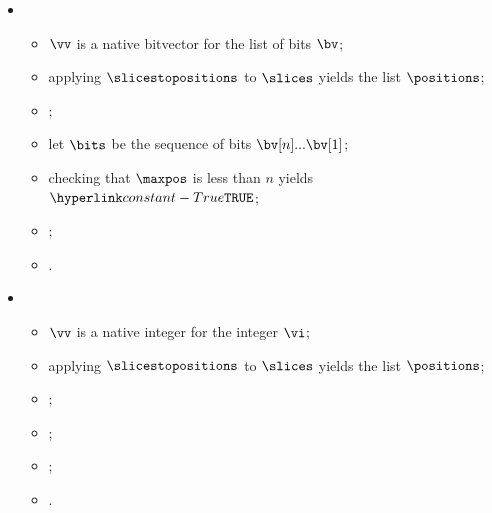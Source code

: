 \ProseParagraph
\OneApplies
\begin{itemize}
  \item {}
  \begin{itemize}
    \item $\vv$ is a native bitvector for the list of bits $\bv$;
    \item applying $\slicestopositions$ to $\slices$ yields the list $\positions$\ProseOrError;
    \item {};
    \item let $\bits$ be the sequence of bits $\bv[n] ... \bv[1]$;
    \item checking that $\maxpos$ is less than $n$ yields $\True$\ProseTerminateAs{\BadIndex};
    \item {};
    \item {}.
  \end{itemize}

  \item {}
  \begin{itemize}
    \item $\vv$ is a native integer for the integer $\vi$;
    \item applying $\slicestopositions$ to $\slices$ yields the list $\positions$\ProseOrError;
    \item {};
    \item {};
    \item {};
    \item {}.
  \end{itemize}
\end{itemize}

